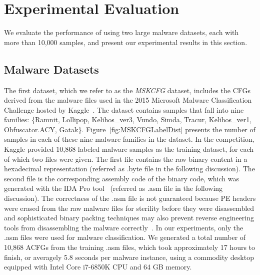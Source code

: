 \section{Experimental Evaluation}\label{sec:Experiment}
We evaluate the performance of \sysname using two large malware datasets, each with more than 10,000 samples, and present our experimental results in this section.

\subsection{Malware Datasets}
The first dataset, which we refer to as the \textit{MSKCFG} dataset, includes the CFGs derived from the malware files used in the 2015 Microsoft Malware Classification Challenge hosted by Kaggle~\cite{MsAcfgDataset}. The dataset contains samples that fall into nine families: \{Ramnit, Lollipop, Kelihos\_ver3, Vundo, Simda, Tracur, Kelihos\_ver1, Obfuscator.ACY, Gatak\}.
Figure~\ref{fig:MSKCFGLabelDist} presents the number of samples in each of these nine malware families in the dataset.
In the competition, Kaggle provided 10,868 labeled malware samples as the training dataset, for each of which two files were given.
The first file contains the raw binary content in a hexadecimal representation (referred as .byte file in the following discussion).
The second file is the corresponding assembly code of the binary code, which was generated with the IDA Pro tool~\cite{bib:idapro} (referred as .asm file in the following discussion).
The correctness of the .asm file is not guaranteed because PE headers were erased from the raw malware files for sterility before they were disassembled and sophisticated binary packing techniques may also prevent reverse engineering tools from disassembling the malware correctly~\cite{BinaryUnpacking}. 
In our experiments, only the .asm files were used for malware classification.
We generated a total number of 10,868 ACFGs from the training .asm files, which took approximately 17 hours to finish, or averagely 5.8 seconds per malware instance,
using a commodity desktop equipped with Intel Core i7-6850K CPU and 64 GB memory.

